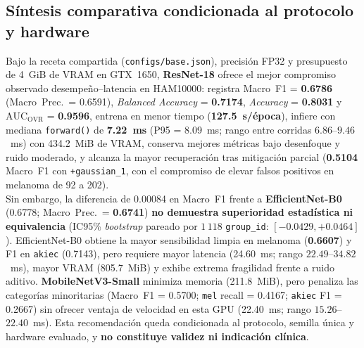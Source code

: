 \subsection{Síntesis comparativa condicionada al protocolo y hardware}
\begin{tcolorbox}[resBox,title={Recomendación académica condicionada sobre GTX~1650 (\texttt{seed=42}, $n=1\,503$)}]
Bajo la receta compartida (\texttt{configs/base.json}), precisión FP32 y presupuesto de 4~GiB de VRAM en GTX~1650, \textbf{ResNet-18} ofrece el mejor compromiso observado desempeño--latencia en HAM10000: registra Macro~F1 = \textbf{0.6786} (Macro~Prec.\ = 0.6591), \textit{Balanced Accuracy} = \textbf{0.7174}, \textit{Accuracy} = \textbf{0.8031} y $\mathrm{AUC}_{\mathrm{OVR}}$ = \textbf{0.9596}, entrena en menor tiempo (\textbf{127.5~s/época}), infiere con mediana \texttt{forward()} de \textbf{7.22~ms} (P95 = 8.09~ms; rango entre corridas $6.86$--$9.46$~ms) con 434.2~MiB de VRAM, conserva mejores métricas bajo desenfoque y ruido moderado, y alcanza la mayor recuperación tras mitigación parcial (\textbf{0.5104} Macro~F1 con \texttt{+gaussian\_1}, con el compromiso de elevar falsos positivos en melanoma de 92 a 202).\\[4pt]
Sin embargo, la diferencia de 0.00084 en Macro~F1 frente a \textbf{EfficientNet-B0} (0.6778; Macro~Prec.\ = \textbf{0.6741}) \textbf{no demuestra superioridad estadística ni equivalencia} (IC95\% \textit{bootstrap} pareado por $1\,118$ \texttt{group\_id}: $[-0.0429, +0.0464]$). EfficientNet-B0 obtiene la mayor sensibilidad limpia en melanoma (\textbf{0.6607}) y F1 en \texttt{akiec} (0.7143), pero requiere mayor latencia (24.60~ms; rango $22.49$--$34.82$~ms), mayor VRAM (805.7~MiB) y exhibe extrema fragilidad frente a ruido aditivo. \textbf{MobileNetV3-Small} minimiza memoria (211.8~MiB), pero penaliza las categorías minoritarias (Macro~F1 = 0.5700; \texttt{mel} recall = 0.4167; \texttt{akiec} F1 = 0.2667) sin ofrecer ventaja de velocidad en esta GPU (22.40~ms; rango $15.26$--$22.40$~ms). Esta recomendación queda condicionada al protocolo, semilla única y hardware evaluado, y \textbf{no constituye validez ni indicación clínica}.
\end{tcolorbox}
\FloatBarrier

